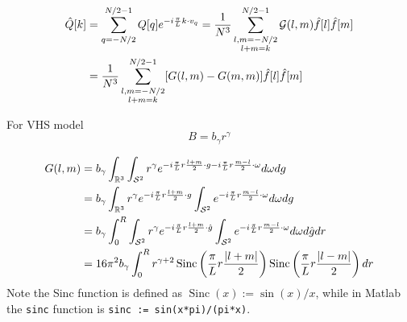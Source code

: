 \documentclass[11pt]{amsart}
\begin{document}
\color{blue}
\begin{align*}\begin{split}
\hat Q[k] &=  \sum_{q=-N/2}^{N/2-1} Q[q]e^{-i{\pi \over L}k\cdot v_q}=   \frac{1}{N^3} \sum_{\substack{l,m= -N/2 \\ l+m = k}}^{N/2-1}\mathcal{G}(l,m)\hat f[l] \hat f[m]  \\
&= \frac{1}{N^3} \sum_{\substack{l,m= -N/2 \\ l+m = k}}^{N/2-1} [G(l,m) - G(m,m)]\hat f[l] \hat f[m]
\end{split}\end{align*}
\color{black}

For VHS model
\begin{equation*}
B = b_\gamma r^{\gamma}
\end{equation*}

\begin{align*}
\begin{split}
G(l,m)  &= b_\gamma  \int_{\mathbb{R}^3} \int_{\mathcal{S}^2}  r^{\gamma}e^{-i{\pi \over L}r\frac{l+m}{2} \cdot g -i {\pi \over L} r \frac{m-l}{2}\cdot \omega}d\omega dg \\
&= b_\gamma  \int_{\mathbb{R}^3}  r^{\gamma} e^{-i{\pi \over L}r\frac{l+m}{2} \cdot g } \int_{\mathcal{S}^2} e^{-i {\pi \over L} r \frac{m-l}{2}\cdot \omega}d\omega dg \\
&= b_\gamma  \int_{0}^R\int_{\mathcal{S}^2}  r^{\gamma} e^{-i{\pi \over L}r\frac{l+m}{2} \cdot \hat g }\int_{\mathcal{S}^2}    e^{-i {\pi \over L} r \frac{m-l}{2}\cdot \omega}d\omega d\hat g dr \\
& = 16 \pi^{2} b_{\gamma} \int_{0}^{R} r^{\gamma+2} \operatorname{Sinc}\left(\frac{\pi}{L} r \frac{|l+m|}{2}\right) \operatorname{Sinc}\left(\frac{\pi}{L} r \frac{|l-m|}{2}\right) d r
\end{split}
\end{align*}
Note the Sinc function is defined as $\operatorname{Sinc}(x) := \sin(x)/x$, while in Matlab the \verb|sinc| function is   \verb|sinc := sin(x*pi)/(pi*x)|.
\end{document}
